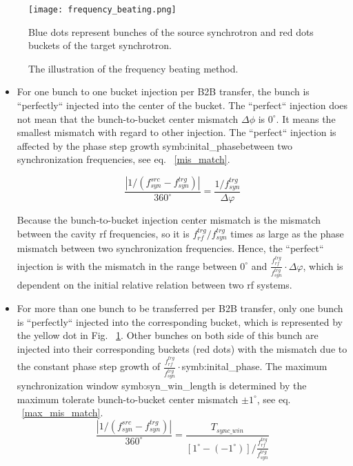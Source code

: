 \begin{figure}[!htb]
   \centering   
   \texttt{[image: frequency\_beating.png]}
   \caption{The illustration of the frequency beating method.}{Blue dots represent bunches of the source synchrotron and red dots buckets of the target synchrotron.}
   \label{frequency_beat}
\end{figure}
\begin{itemize}
\item
For one bunch to one bucket injection per B2B transfer, the bunch is ``perfectly`` injected into the center of the bucket. The ``perfect`` injection does not mean that the bunch-to-bucket center mismatch $\Delta \phi$ is $0^\circ$. It means the smallest mismatch with regard to other injection. The ``perfect`` injection is affected by the phase step growth \gls{symb:inital_phase}between two synchronization frequencies, see eq. ~\ref{mis_match}. 

\begin{equation}
\frac{|1/(f_{\mathit{syn}}^\mathit{src}-f_{\mathit{syn}}^\mathit{trg})|}{360^\circ} = \frac{1/f_{\mathit{syn}}^\mathit{trg}}{\Delta \varphi}\label{mis_match}
\end{equation}

Because the bunch-to-bucket injection center mismatch is the mismatch between the cavity rf frequencies, so it is $f_{\mathit{rf}}^{trg}/f_{\mathit{syn}}^{trg}$ times as large as the phase mismatch between two synchronization frequencies. Hence, the ``perfect`` injection is with the mismatch in the range between $0^\circ$ and $\frac{f_{\mathit{rf}}^\mathit{trg}}{f_{\mathit{syn}}^\mathit{trg}}\cdot\Delta \varphi$, which is dependent on the initial relative relation between two rf systems.

\item 
For more than one bunch to be transferred per B2B transfer, only one bunch is ``perfectly`` injected into the corresponding bucket, which is represented by the yellow dot in Fig. ~\ref{frequency_beat}. Other bunches on both side of this bunch are injected into their corresponding buckets (red dots) with the mismatch due to the constant phase step growth of $\frac{f_{\mathit{rf}}^\mathit{trg}}{f_{\mathit{syn}}^\mathit{trg}}\cdot$\gls{symb:inital_phase}. The maximum synchronization window \gls{symb:syn_win_length} is determined by the maximum tolerate bunch-to-bucket center mismatch $\pm 1^\circ$, see eq. ~\ref{max_mis_match}.
\begin{equation}
\frac{|1/(f_{\mathit{syn}}^\mathit{src}-f_{\mathit{syn}}^\mathit{trg})|}{360^\circ} = \frac{T_{\mathit{sync\_win}}}{[1^\circ-(-1^\circ)]/\frac{f_{\mathit{rf}}^\mathit{trg}}{f_{\mathit{syn}}^\mathit{trg}}}\label{max_mis_match}
\end{equation}

\end{itemize}

